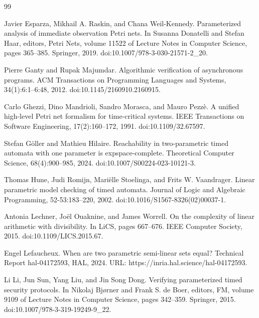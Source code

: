\documentclass[10pt,a4paper]{article}
\begin{document}
\begin{thebibliography}{99}
\par\noindent    Javier Esparza, Mikhail A. Raskin, and Chana Weil-Kennedy.  Parameterized analysis of immediate observation Petri nets.  In Susanna Donatelli and Stefan Haar, editors, Petri Nets, volume 11522 of Lecture Notes in Computer Science, pages 365--385. Springer, 2019.  doi:10.1007/978-3-030-21571-2\_20.  

\par\noindent    Pierre Ganty and Rupak Majumdar.  Algorithmic verification of asynchronous programs.  ACM Transactions on Programming Languages and Systems, 34(1):6:1--6:48, 2012.  doi:10.1145/2160910.2160915.  

\par\noindent    Carlo Ghezzi, Dino Mandrioli, Sandro Morasca, and Mauro Pezzè.  A unified high-level Petri net formalism for time-critical systems.  IEEE Transactions on Software Engineering, 17(2):160--172, 1991.  doi:10.1109/32.67597.  

\par\noindent    Stefan Göller and Mathieu Hilaire.  Reachability in two-parametric timed automata with one parameter is expspace-complete.  Theoretical Computer Science, 68(4):900--985, 2024.  doi:10.1007/S00224-023-10121-3.  

\par\noindent    Thomas Hune, Judi Romijn, Mariëlle Stoelinga, and Frits W. Vaandrager.  Linear parametric model checking of timed automata.  Journal of Logic and Algebraic Programming, 52-53:183--220, 2002.  doi:10.1016/S1567-8326(02)00037-1.  

\par\noindent    Antonia Lechner, Joël Ouaknine, and James Worrell.  On the complexity of linear arithmetic with divisibility.  In LiCS, pages 667--676. IEEE Computer Society, 2015.  doi:10.1109/LICS.2015.67.  

\par\noindent    Engel Lefaucheux.  When are two parametric semi-linear sets equal?  Technical Report hal-04172593, HAL, 2024.  URL: https://inria.hal.science/hal-04172593.  

\par\noindent    Li Li, Jun Sun, Yang Liu, and Jin Song Dong.  Verifying parameterized timed security protocols.  In Nikolaj Bjørner and Frank S. de Boer, editors, FM, volume 9109 of Lecture Notes in Computer Science, pages 342--359. Springer, 2015.  doi:10.1007/978-3-319-19249-9\_22.  


\end{thebibliography}
\end{document}
